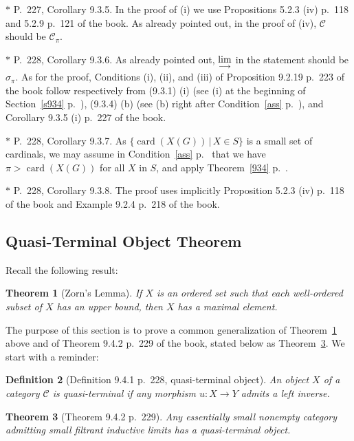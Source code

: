 \documentclass[12pt]{article}
\newtheorem{thm}{Theorem}
\newtheorem{df}[thm]{Definition}
\theoremstyle{remark}
\theoremstyle{definition}
\newcommand{\nn}{\noindent}
\newcommand{\C}{\mathcal C}
\newcommand{\ilim}{\operatornamewithlimits{\underset{\longrightarrow}{lim}}}
\DeclareMathOperator{\card}{card}
\begin{document}
\nn$*$ P.~227, Corollary 9.3.5. In the proof of (i) we use Propositions 5.2.3 (iv) p.~118 and 5.2.9 p.~121 of the book. As already pointed out, in the proof of (iv), $\C$ should be $\C_\pi$. 

\nn$*$ P.~228, Corollary 9.3.6. As already pointed out, $\ilim$ in the statement should be $\sigma_\pi$. As for the proof, Conditions (i), (ii), and (iii) of Proposition 9.2.19 p.~223 of the book follow respectively from (9.3.1) (i) (see (i) at the beginning of Section~\ref{s934} p.~\pageref{s934}), (9.3.4) (b) (see (b) right after Condition~\ref{ass} p.~\pageref{ass}), and Corollary 9.3.5 (i) p.~227 of the book. 

\nn$*$ P.~228, Corollary 9.3.7. As $\{\card(X(G))\,|\,X\in S\}$ is a small set of cardinals, we may assume in Condition~\ref{ass} p.~\pageref{ass} that we have $\pi>\card(X(G))$ for all $X$ in $S$, and apply Theorem~\ref{934} p.~\pageref{934}. 

\nn$*$ P.~228, Corollary 9.3.8. The proof uses implicitly Proposition 5.2.3 (iv) p.~118 of the book and Example 9.2.4 p.~218 of the book. 


\subsection{Quasi-Terminal Object Theorem }

Recall the following result:

\begin{thm}[Zorn's Lemma]\label{zorn}
If $X$ is an ordered set such that each well-ordered subset of $X$ has an upper bound, then $X$ has a maximal element.
\end{thm}

The purpose of this section is to prove a common generalization of Theorem~\ref{zorn} above and of Theorem 9.4.2 p.~229 of the book, stated below as Theorem~\ref{942}. We start with a reminder:

\begin{df}[Definition 9.4.1 p.~228, quasi-terminal object] 
An object $X$ of a category $\C$ is {\em quasi-terminal} if any morphism $u:X\to Y$ admits a left inverse.
\end{df}

\begin{thm}[Theorem 9.4.2 p.~229]\label{942} 
Any essentially small nonempty category admitting small filtrant inductive limits has a quasi-terminal object.
\end{thm}
\end{document}
